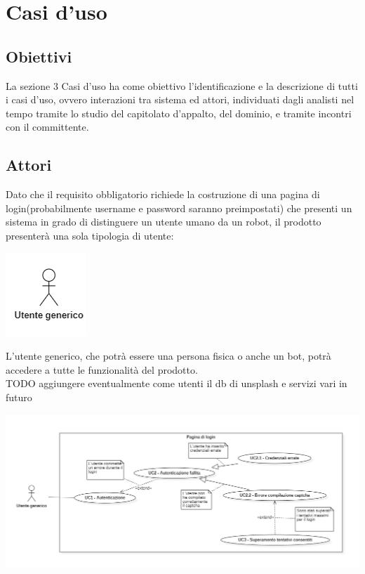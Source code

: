 \section{Casi d'uso}

\subsection{Obiettivi}
La sezione 3 Casi d'uso ha come obiettivo l'identificazione e la descrizione di tutti i casi d'uso, ovvero interazioni tra sistema ed attori, individuati dagli analisti nel tempo tramite lo studio del capitolato d'appalto, del dominio, e tramite incontri con il committente.

\subsection{Attori}
Dato che il requisito obbligatorio richiede la costruzione di una pagina di login(probabilmente username e password saranno preimpostati) che presenti un sistema in grado di distinguere un utente umano da un robot, il prodotto presenterà una sola tipologia di utente:\\
\begin{center}
\includegraphics[scale = 1]{img/utente_generico.png}\\
\end{center}
L'utente generico, che potrà essere una persona fisica o anche un bot, potrà accedere a tutte le funzionalità del prodotto. \\
TODO aggiungere eventualmente come utenti il db di unsplash e servizi vari in futuro

\begin{center}
\includegraphics[scale = 0.65]{img/MainUML.png}\\
\end{center}

